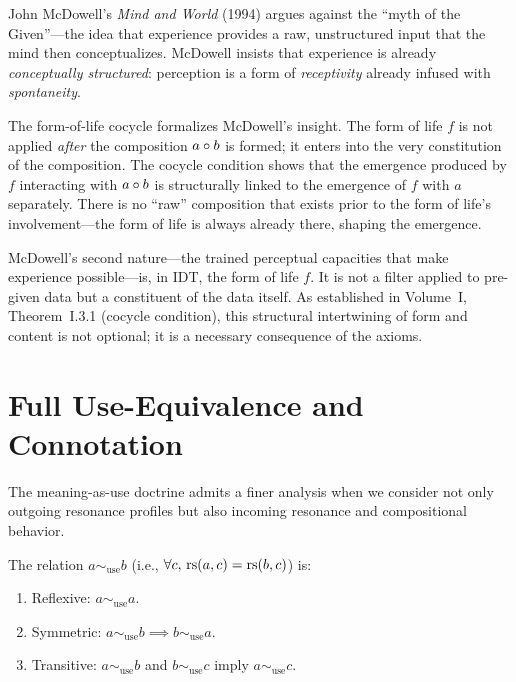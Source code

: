 \begin{interpretation}
John McDowell's \textit{Mind and World} (1994) argues against the ``myth of the
Given''---the idea that experience provides a raw, unstructured input that the
mind then conceptualizes. McDowell insists that experience is already
\emph{conceptually structured}: perception is a form of \emph{receptivity}
already infused with \emph{spontaneity}.

The form-of-life cocycle formalizes McDowell's insight. The form of life $f$ is
not applied \emph{after} the composition $a \circ b$ is formed; it enters
into the very constitution of the composition. The cocycle condition shows
that the emergence produced by $f$ interacting with $a \circ b$ is
structurally linked to the emergence of $f$ with $a$ separately. There is no
``raw'' composition that exists prior to the form of life's involvement---the
form of life is always already there, shaping the emergence.

McDowell's second nature---the trained perceptual capacities that make
experience possible---is, in IDT, the form of life $f$. It is not a filter
applied to pre-given data but a constituent of the data itself. As established
in Volume~I, Theorem~I.3.1 (cocycle condition), this structural intertwining
of form and content is not optional; it is a necessary consequence of the axioms.
\end{interpretation}

\section{Full Use-Equivalence and Connotation}

The meaning-as-use doctrine admits a finer analysis when we consider not only
outgoing resonance profiles but also incoming resonance and compositional behavior.

\begin{theorem}
\label{thm:same-use-equiv}
The relation $a \sim_{\mathrm{use}} b$ (i.e., $\forall c,\, \mathrm{rs}(a,c) = \mathrm{rs}(b,c)$) is:
\begin{enumerate}
\item Reflexive: $a \sim_{\mathrm{use}} a$.
\item Symmetric: $a \sim_{\mathrm{use}} b \implies b \sim_{\mathrm{use}} a$.
\item Transitive: $a \sim_{\mathrm{use}} b$ and $b \sim_{\mathrm{use}} c$ imply $a \sim_{\mathrm{use}} c$.
\end{enumerate}
\end{theorem}

